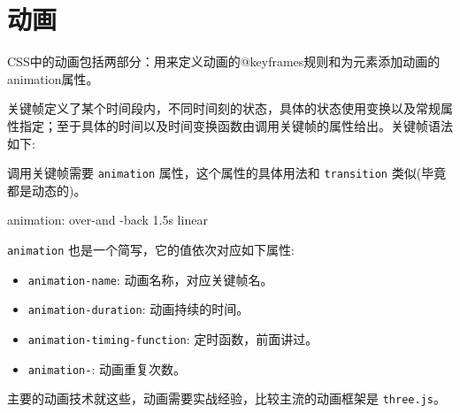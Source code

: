 \section{动画}

CSS中的动画包括两部分：用来定义动画的@keyframes规则和为元素添加动画的animation属性。

关键帧定义了某个时间段内，不同时间刻的状态，具体的状态使用变换以及常规属性指定；至于具体的时间以及时间变换函数由调用关键帧的属性给出。关键帧语法如下:


调用关键帧需要 \texttt{animation} 属性，这个属性的具体用法和 \texttt{transition} 类似(毕竟都是动态的)。

\begin{HTML}
animation: over-and  -back 1.5s linear 
\end{HTML}

\texttt{animation} 也是一个简写，它的值依次对应如下属性:
\begin{itemize}
    \item \texttt{animation-name}: 动画名称，对应关键帧名。
    \item \texttt{animation-duration}: 动画持续的时间。
    \item \texttt{animation-timing-function}: 定时函数，前面讲过。
    \item \texttt{animation-}: 动画重复次数。
\end{itemize}

主要的动画技术就这些，动画需要实战经验，比较主流的动画框架是 \texttt{three.js}。

\newpage